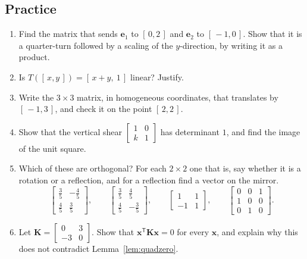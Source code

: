 \documentclass[11pt]{article}
\theoremstyle{plain}
\theoremstyle{definition}
\theoremstyle{remark}
\newcommand{\vc}[1]{\mathbf{#1}}
\newcommand{\mt}[1]{\mathbf{#1}}
\newcommand{\T}{^{\mathsf{T}}}
\begin{document}
\subsection{Practice}
\begin{enumerate}[label=\textbf{P\arabic*.},leftmargin=2.6em,itemsep=5pt]
  \item Find the matrix that sends $\vc{e}_1$ to $[\,0,2\,]$ and $\vc{e}_2$ to
        $[\,-1,0\,]$. Show that it is a quarter-turn followed by a scaling of
        the $y$-direction, by writing it as a product.
  \item Is $T([\,x,y\,])=[\,x+y,\ 1\,]$ linear? Justify.
  \item Write the $3\times3$ matrix, in homogeneous coordinates, that
        translates by $[\,-1,3\,]$, and check it on the point $[\,2,2\,]$.
  \item Show that the vertical shear $\begin{bmatrix}1&0\\k&1\end{bmatrix}$ has
        determinant $1$, and find the image of the unit square.
  \item Which of these are orthogonal? For each $2\times2$ one that is, say
        whether it is a rotation or a reflection, and for a reflection find a
        vector on the mirror.
        \[
          \begin{bmatrix}\tfrac35&-\tfrac45\\[2pt]\tfrac45&\tfrac35\end{bmatrix},\qquad
          \begin{bmatrix}\tfrac35&\tfrac45\\[2pt]\tfrac45&-\tfrac35\end{bmatrix},\qquad
          \begin{bmatrix}1&1\\-1&1\end{bmatrix},\qquad
          \begin{bmatrix}0&0&1\\1&0&0\\0&1&0\end{bmatrix}.
        \]
  \item Let $\mt{K}=\begin{bmatrix}0&3\\-3&0\end{bmatrix}$. Show that
        $\vc{x}\T\mt{K}\vc{x}=0$ for every $\vc{x}$, and explain why this does
        not contradict Lemma~\ref{lem:quadzero}.
\end{enumerate}
\end{document}

